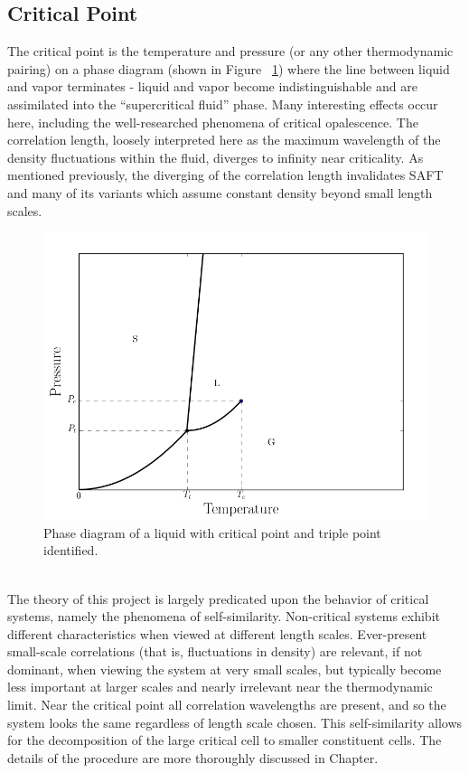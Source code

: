 \documentclass[12pt]{article}
\begin{document}
\subsection{Critical Point} 
The critical point is the temperature and pressure (or any other thermodynamic pairing) on a phase diagram (shown in Figure ~\ref{phase}) where the line between liquid and vapor terminates - liquid and vapor become indistinguishable and are assimilated into the ``supercritical fluid'' phase. Many interesting effects occur here, including the well-researched phenomena of critical opalescence. The correlation length, loosely interpreted here as the maximum wavelength of the density fluctuations within the fluid, diverges to infinity near criticality. As mentioned previously, the diverging of the correlation length invalidates SAFT and many of its variants which assume constant density beyond small length scales. 
\begin{figure}
    \centering
    \includegraphics[width=.75\textwidth]{phase.png}
    \caption{Phase diagram of a liquid with critical point and triple point identified.}
    \label{phase}
\end{figure}
\\
The theory of this project is largely predicated upon the behavior of critical systems, namely the phenomena of self-similarity. Non-critical systems exhibit different characteristics when viewed at different length scales. Ever-present small-scale correlations (that is, fluctuations in density) are relevant, if not dominant, when viewing the system at very small scales, but typically become less important at larger scales and nearly irrelevant near the thermodynamic limit. Near the critical point all correlation wavelengths are present, and so the system looks the same regardless of length scale chosen. This self-similarity allows for the decomposition of the large critical cell to smaller constituent cells. The details of the procedure are more thoroughly discussed in Chapter.
\end{document}

